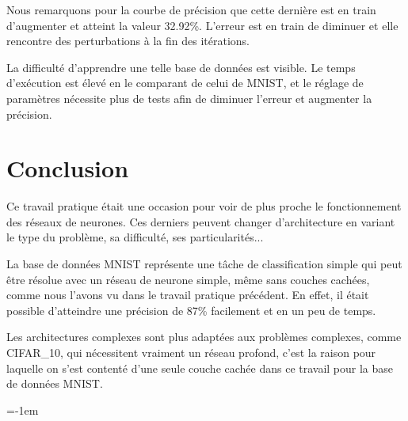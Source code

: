 \documentclass[a4paper,english,12pt]{article}
\makeatletter
\newcommand{\emptypage}[1]{
  \cleardoublepage
  \begingroup
  \let\ps@plain\ps@empty
  \pagestyle{empty}
  #1
  \cleardoublepage
  \endgroup}
\makeatother
\begin{document}
Nous remarquons pour la courbe de précision que cette dernière est en train d'augmenter et atteint la valeur 32.92\%. L'erreur est en train de diminuer et elle rencontre des perturbations à la fin des itérations. 

La difficulté d'apprendre une telle base de données est visible. Le temps d'exécution est élevé en le comparant de celui de MNIST, et le réglage de paramètres nécessite plus de tests afin de diminuer l'erreur et augmenter la précision. 

\section{Conclusion}
Ce travail pratique était une occasion pour voir de plus proche le fonctionnement des réseaux de neurones. Ces derniers peuvent changer d'architecture en variant le type du problème, sa difficulté, ses particularités... 

La base de données MNIST représente une tâche de classification simple qui peut être résolue avec un réseau de neurone simple, même sans couches cachées, comme nous l'avons vu dans le travail pratique précédent. En effet, il était possible d'atteindre une précision de 87\% facilement et en un peu de temps.

Les architectures complexes sont plus adaptées aux problèmes complexes, comme CIFAR\_10, qui nécessitent vraiment un réseau profond, c'est la raison pour laquelle on s'est contenté d'une seule couche cachée dans ce travail pour la base de données MNIST.

\parskip=-1em
\let\section\oldsection %
%
\end{document}
